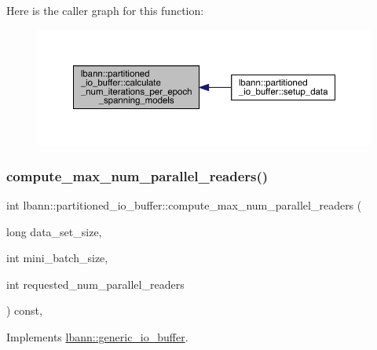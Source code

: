 Here is the caller graph for this function\+:\nopagebreak
\begin{figure}[H]
\begin{center}
\leavevmode
\includegraphics[width=350pt]{classlbann_1_1partitioned__io__buffer_a50b6e2b7a82927526758f7cfb18a1ded_icgraph}
\end{center}
\end{figure}
\mbox{\label{classlbann_1_1partitioned__io__buffer_a5048100fb7cdc13908ecba6b4415b977}} 
\subsubsection{\texorpdfstring{compute\+\_\+max\+\_\+num\+\_\+parallel\+\_\+readers()}{compute\_max\_num\_parallel\_readers()}}
{\footnotesize\ttfamily int lbann\+::partitioned\+\_\+io\+\_\+buffer\+::compute\+\_\+max\+\_\+num\+\_\+parallel\+\_\+readers (\begin{DoxyParamCaption}\item[{long}]{data\+\_\+set\+\_\+size,  }\item[{int}]{mini\+\_\+batch\+\_\+size,  }\item[{int}]{requested\+\_\+num\+\_\+parallel\+\_\+readers }\end{DoxyParamCaption}) const\hspace{0.3cm}{\ttfamily [override]}, {\ttfamily [virtual]}}



Implements \hyperlink{classlbann_1_1generic__io__buffer_affc26b29e3f9eaaae5c033648e1a0141}{lbann\+::generic\+\_\+io\+\_\+buffer}.



